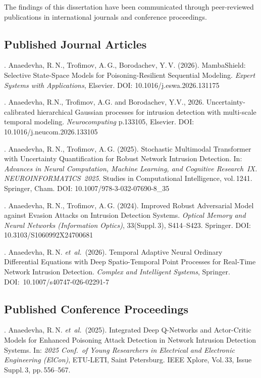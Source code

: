 The findings of this dissertation have been communicated through peer-reviewed publications in international journals and conference proceedings.

\subsection*{Published Journal Articles}

. Anaedevha, R.\,N., Trofimov, A.\,G., Borodachev, Y.\,V. (2026). MambaShield: Selective State-Space Models for Poisoning-Resilient Sequential Modeling. \textit{Expert Systems with Applications}, Elsevier. DOI: 10.1016/j.eswa.2026.131175

. Anaedevha, R.N., Trofimov, A.G. and Borodachev, Y.V., 2026. Uncertainty-calibrated hierarchical Gaussian processes for intrusion detection with multi-scale temporal modeling. \textit{Neurocomputing} p.133105, Elsevier. DOI: 10.1016/j.neucom.2026.133105

. Anaedevha, R.\,N., Trofimov, A.\,G. (2025). Stochastic Multimodal Transformer with Uncertainty Quantification for Robust Network Intrusion Detection. In: \textit{Advances in Neural Computation, Machine Learning, and Cognitive Research~IX. NEUROINFORMATICS~2025}. Studies in Computational Intelligence, vol.\,1241. Springer, Cham. DOI: 10.1007/978-3-032-07690-8\_35

. Anaedevha, R.\,N., Trofimov, A.\,G. (2024). Improved Robust Adversarial Model against Evasion Attacks on Intrusion Detection Systems. \textit{Optical Memory and Neural Networks (Information Optics)}, 33(Suppl.\,3), S414--S423. Springer. DOI: 10.3103/S1060992X24700681

. Anaedevha, R.\,N. \textit{et~al.}\ (2026). Temporal Adaptive Neural Ordinary Differential Equations with Deep Spatio-Temporal Point Processes for Real-Time Network Intrusion Detection. \textit{Complex and Intelligent Systems}, Springer. DOI:~10.1007/s40747-026-02291-7


\subsection*{Published Conference Proceedings}

. Anaedevha, R.\,N. \textit{et~al.}\ (2025). Integrated Deep Q-Networks and Actor-Critic Models for Enhanced Poisoning Attack Detection in Network Intrusion Detection Systems. In: \textit{2025 Conf.\ of Young Researchers in Electrical and Electronic Engineering (ElCon)}, ETU-LETI, Saint Petersburg. IEEE Xplore, Vol.\,33, Issue Suppl.\,3, pp.\,556--567.

